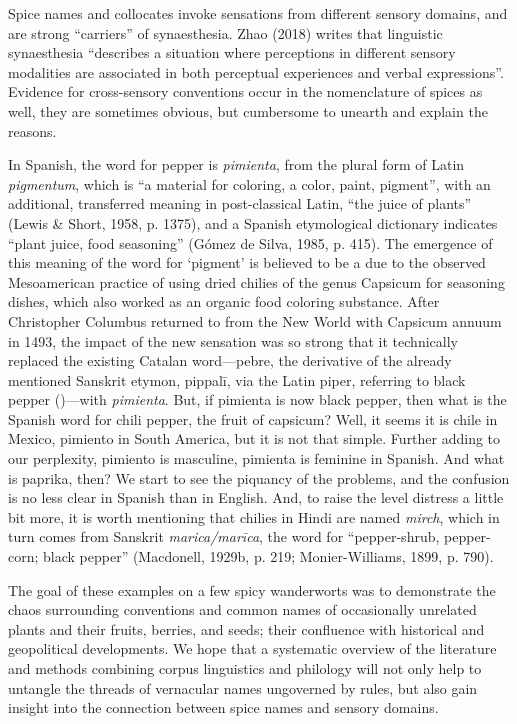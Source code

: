 Spice names and collocates invoke sensations from different sensory domains, and are strong ``carriers'' of synaesthesia. Zhao (2018) writes that linguistic synaesthesia ``describes a situation where perceptions in different sensory modalities are associated in both perceptual experiences and verbal expressions''. Evidence for cross-sensory conventions occur in the nomenclature of spices as well, they are sometimes obvious, but cumbersome to unearth and explain the reasons.

In Spanish, the word for pepper is \textit{pimienta}, from the plural form of Latin \textit{pigmentum}, which is ``a material for coloring, a color, paint, pigment'', with an additional, transferred meaning in post-classical Latin, ``the juice of plants'' (Lewis \& Short, 1958, p. 1375), and a Spanish etymological dictionary indicates ``plant juice, food seasoning'' (Gómez de Silva, 1985, p. 415). The emergence of this meaning of the word for `pigment' is believed to be a due to the observed Mesoamerican practice of using dried chilies of the genus Capsicum for seasoning dishes, which also worked as an organic food coloring substance. After Christopher Columbus returned to from the New World with Capsicum annuum in 1493, the impact of the new sensation was so strong that it technically replaced the existing Catalan word---pebre, the derivative of the already mentioned Sanskrit etymon, pippalī, via the Latin piper, referring to black pepper ()---with \textit{pimienta}. But, if pimienta is now black pepper, then what is the Spanish word for chili pepper, the fruit of capsicum? Well, it seems it is chile in Mexico, pimiento in South America, but it is not that simple. Further adding to our perplexity, pimiento is masculine, pimienta is feminine in Spanish. And what is paprika, then? We start to see the piquancy of the problems, and the confusion is no less clear in Spanish than in English. And, to raise the level distress a little bit more, it is worth mentioning that chilies in Hindi are named \textit{mirch}, which in turn comes from Sanskrit \textit{marica/marīca}, the word for ``pepper-shrub, pepper-corn; black pepper'' (Macdonell, 1929b, p. 219; Monier-Williams, 1899, p. 790).

The goal of these examples on a few spicy \glspl{wanderwort} was to demonstrate the chaos surrounding conventions and common names of occasionally unrelated plants and their fruits, berries, and seeds; their confluence with historical and geopolitical developments. We hope that a systematic overview of the literature and methods combining corpus linguistics and philology will not only help to untangle the threads of vernacular names ungoverned by rules, but also gain insight into the connection between spice names and sensory domains.


